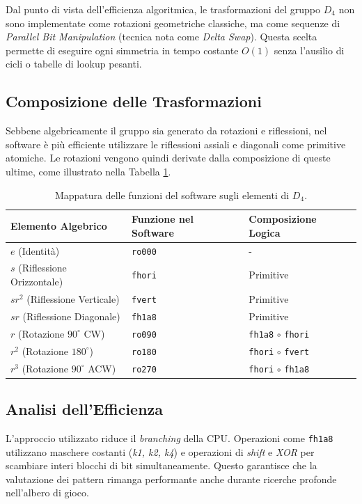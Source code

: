 Dal punto di vista dell'efficienza algoritmica, le trasformazioni del gruppo $D_4$ non sono implementate come rotazioni geometriche classiche, ma come sequenze di \textit{Parallel Bit Manipulation} (tecnica nota come \textit{Delta Swap}). Questa scelta permette di eseguire ogni simmetria in tempo costante $O(1)$ senza l'ausilio di cicli o tabelle di lookup pesanti.

\subsection{Composizione delle Trasformazioni}
Sebbene algebricamente il gruppo sia generato da rotazioni e riflessioni, nel software è più efficiente utilizzare le riflessioni assiali e diagonali come primitive atomiche. Le rotazioni vengono quindi derivate dalla composizione di queste ultime, come illustrato nella Tabella \ref{tab:code_mapping}.

\begin{table}[h]
\centering
\caption{Mappatura delle funzioni del software sugli elementi di $D_4$.}
\label{tab:code_mapping}
\begin{tabular}{lll}
\hline
\textbf{Elemento Algebrico} & \textbf{Funzione nel Software} & \textbf{Composizione Logica} \\ \hline
$e$ (Identità) & \texttt{ro000} & - \\
$s$ (Riflessione Orizzontale) & \texttt{fhori} & Primitive \\
$sr^2$ (Riflessione Verticale) & \texttt{fvert} & Primitive \\
$sr$ (Riflessione Diagonale) & \texttt{fh1a8} & Primitive \\
$r$ (Rotazione $90^\circ$ CW) & \texttt{ro090} & \texttt{fh1a8} $\circ$ \texttt{fhori} \\
$r^2$ (Rotazione $180^\circ$) & \texttt{ro180} & \texttt{fhori} $\circ$ \texttt{fvert} \\
$r^3$ (Rotazione $90^\circ$ ACW) & \texttt{ro270} & \texttt{fhori} $\circ$ \texttt{fh1a8} \\ \hline
\end{tabular}
\end{table}

\subsection{Analisi dell'Efficienza}
L'approccio utilizzato riduce il \textit{branching} della CPU.
Operazioni come \texttt{fh1a8} utilizzano maschere costanti (\textit{k1, k2, k4}) e operazioni
di \textit{shift} e \textit{XOR} per scambiare interi blocchi di bit simultaneamente.
Questo garantisce che la valutazione dei pattern rimanga performante anche durante ricerche profonde nell'albero di gioco.

